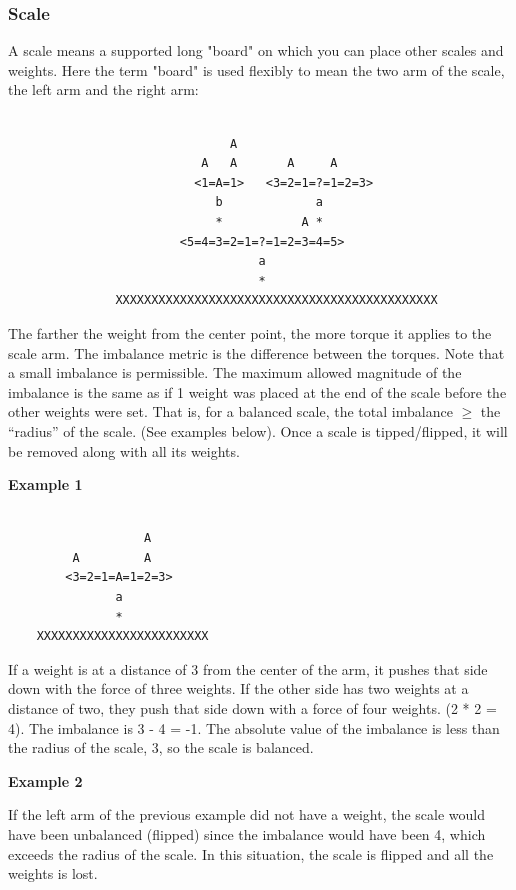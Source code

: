 \documentclass[12pt]{article}
\begin{document}
\subsubsection{Scale}
A scale means a supported long "board" on which you can place other scales
and weights. Here the term "board" is used flexibly to mean the two arm of the
scale, the left arm and the right arm:
\begin{verbatim}

                               A
                           A   A       A     A
                          <1=A=1>   <3=2=1=?=1=2=3>
                             b             a
                             *           A *
                        <5=4=3=2=1=?=1=2=3=4=5>
                                   a
                                   *
               XXXXXXXXXXXXXXXXXXXXXXXXXXXXXXXXXXXXXXXXXXXXX
\end{verbatim}

The farther the weight from the center point, the more torque it applies to the
scale arm. The imbalance metric is the difference between the torques. Note that
a small imbalance is permissible. The maximum allowed magnitude of the imbalance
is the same as if 1 weight was placed at the end of the scale before the other
weights were set. That is, for a balanced scale, the total imbalance $\geq$ the
``radius” of the scale. (See examples below).  Once a scale is tipped/flipped,
it will be removed along with all its weights.

\newpage
\textbf{Example 1}
\begin{verbatim}

                   A
         A         A
        <3=2=1=A=1=2=3>
               a
               *
    XXXXXXXXXXXXXXXXXXXXXXXX
\end{verbatim}

If a weight is at a distance of 3 from the center of the arm, it pushes that
side down with the force of three weights. If the other side has two weights at
a distance of two, they push that side down with a force of four weights. (2 * 2
= 4). The imbalance is 3 - 4 = -1. The absolute value of the imbalance is less
than the radius of the scale, 3, so the scale is balanced.

\textbf{Example 2}

If the left arm of the previous example did not have a weight, the scale would
have been unbalanced (flipped) since the imbalance would have been 4, which
exceeds the radius of the scale. In this situation, the scale is flipped and all
the weights is lost.  
\end{document}
